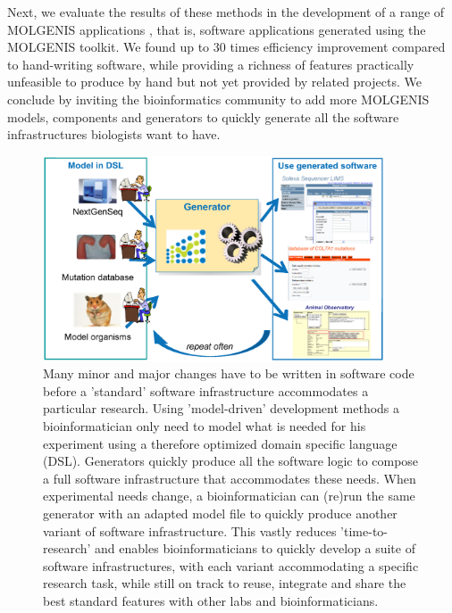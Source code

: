 Next, we evaluate the results of these methods in the development of a range of MOLGENIS applications 
\cite{Swertz:2004, Swertz:2010a, Thorisson:2009, Leu:2010, Li:2009, Smedley:2008}, that is, software 
applications generated using the MOLGENIS toolkit. We found up to 30 times efficiency improvement compared 
to hand-writing software, while providing a richness of features practically unfeasible to produce by 
hand but not yet provided by related projects. We conclude by inviting the bioinformatics community to 
add more MOLGENIS models, components and generators to quickly generate all the software infrastructures biologists want to have.

\begin{figure}[ht!]
  \centering
  \includegraphics[width=0.9\textwidth]{eps/image_5_1.eps}
  \caption[MOLGENIS]
    {Many minor and major changes have to be written in software code before a 'standard' software infrastructure 
    accommodates a particular research. Using 'model-driven' development methods a bioinformatician only need to 
    model what is needed for his experiment using a therefore optimized domain specific language (DSL). Generators 
    quickly produce all the software logic to compose a full software infrastructure that accommodates these needs. 
    When experimental needs change, a bioinformatician can (re)run the same generator with an adapted model file 
    to quickly produce another variant of software infrastructure. This vastly reduces 'time-to-research' and 
    enables bioinformaticians to quickly develop a suite of software infrastructures, with each variant accommodating 
    a specific research task, while still on track to reuse, integrate and share the best standard features with 
    other labs and bioinformaticians.}
    \label{fig:modelDrivenDevelopment}
\end{figure}

